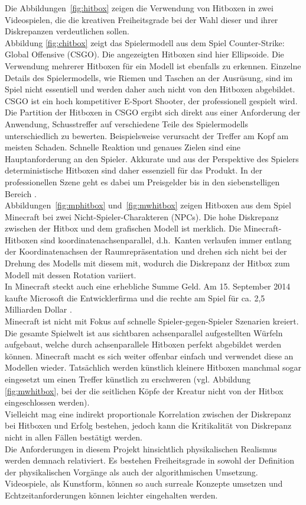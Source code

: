Die Abbildungen~\ref{fig:hitbox} zeigen die Verwendung von Hitboxen \cite{hitbox} in zwei Videospielen, die die kreativen Freiheitsgrade bei der Wahl dieser und ihrer Diskrepanzen verdeutlichen sollen.\\
Abbildung \ref{fig:chitbox} zeigt das Spielermodell aus dem Spiel Counter-Strike: Global Offensive (CSGO). Die angezeigten Hitboxen sind hier Ellipsoide.
Die Verwendung mehrerer Hitboxen für ein Modell ist ebenfalls zu erkennen.
Einzelne Details des Spielermodells, wie Riemen und Taschen an der Ausrüsung, sind im Spiel nicht essentiell und werden daher auch nicht von den Hitboxen abgebildet.\\
CSGO ist ein hoch kompetitiver E-Sport Shooter, der professionell gespielt wird.
Die Partition der Hitboxen in CSGO ergibt sich direkt aus einer Anforderung der Anwendung, Schusstreffer auf verschiedene Teile des Spielermodells unterschiedlich zu bewerten. Beispielsweise verursacht der Treffer am Kopf am meisten Schaden. Schnelle Reaktion und genaues Zielen sind eine Hauptanforderung an den Spieler. Akkurate und aus der Perspektive des Spielers deterministische Hitboxen sind daher essenziell für das Produkt. In der professionellen Szene geht es dabei um Preisgelder bis in den siebenstelligen Bereich \cite{csgoprice}.\\
Abbildungen~\ref{fig:mphitbox} und~\ref{fig:mwhitbox} zeigen Hitboxen aus dem Spiel Minecraft bei zwei Nicht-Spieler-Charakteren (NPCs). Die hohe Diskrepanz zwischen der Hitbox und dem grafischen Modell ist merklich. Die Minecraft-Hitboxen sind koordinatenachsenparallel, d.h.~Kanten verlaufen immer entlang der Koordinatenachsen der Raumrepräsentation und drehen sich nicht bei der Drehung des Modells mit diesem mit, wodurch die Diskrepanz der Hitbox zum Modell mit dessen Rotation variiert.\\
In Minecraft steckt auch eine erhebliche Summe Geld. Am 15. September 2014 kaufte Microsoft die Entwicklerfirma und die rechte am Spiel für ca. 2,5 Milliarden Dollar \cite{buyminecraft}.\\
Minecraft ist nicht mit Fokus auf schnelle Spieler-gegen-Spieler Szenarien kreiert. Die gesamte Spielwelt ist aus sichtbaren achsenparallel aufgestellten Würfeln aufgebaut, welche durch achsenparallele Hitboxen perfekt abgebildet werden können. Minecraft macht es sich weiter offenbar einfach und verwendet diese an Modellen wieder. Tatsächlich werden künstlich kleinere Hitboxen manchmal sogar eingesetzt um einen Treffer künstlich zu erschweren (vgl. Abbildung \ref{fig:mwhitbox}, bei der die seitlichen Köpfe der Kreatur nicht von der Hitbox eingeschlossen werden).\\
Vielleicht mag eine indirekt proportionale Korrelation zwischen der Diskrepanz bei Hitboxen und Erfolg bestehen, jedoch kann die Kritikalität von Diskrepanz nicht in allen Fällen bestätigt werden.\\

Die Anforderungen in diesem Projekt hinsichtlich physikalischen Realismus werden demnach relativiert. Es bestehen Freiheitsgrade in sowohl der Definition der physikalischen Vorgänge als auch der algorithmischen Umsetzung. 
Videospiele, als Kunstform, können so auch surreale Konzepte umsetzen und Echtzeitanforderungen können leichter eingehalten werden.
